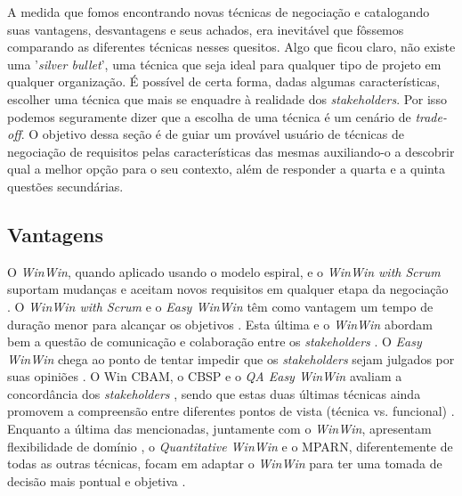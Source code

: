  A medida que fomos encontrando novas técnicas de negociação e catalogando suas
 vantagens, desvantagens e seus achados, era
 inevitável que fôssemos comparando as diferentes técnicas nesses quesitos.
 Algo que ficou claro, não existe uma '\textit{silver bullet}', uma técnica que
 seja ideal para qualquer tipo de projeto em qualquer organização. É possível de certa forma, dadas algumas características, escolher uma técnica que mais se enquadre à realidade dos \textit{stakeholders}. Por isso podemos seguramente
 dizer que a escolha de uma técnica é um cenário de \textit{trade-off}. O
 objetivo dessa seção é de guiar um provável usuário de técnicas de negociação
 de requisitos pelas características das mesmas auxiliando-o a descobrir qual
 a melhor opção para o seu contexto, além de responder a quarta e a quinta questões secundárias.

\subsection{Vantagens}

O \textit{WinWin}, quando aplicado usando o modelo espiral, e o \textit{WinWin
with Scrum} suportam mudanças e aceitam novos requisitos em qualquer etapa da
 negociação \cite{boehm2001developing}\cite{khan2014integration}.
O \textit{WinWin with Scrum} e o \textit{Easy WinWin} têm como vantagem um tempo
de duração menor para alcançar os objetivos
\cite{khan2014integration}\cite{briggs2002easywinwin}. Esta última e o
\textit{WinWin} abordam bem a questão de comunicação e colaboração entre os
\textit{stakeholders} \cite{grunbacher2001surfacing}\cite{boehm1998winwin}.
O \textit{Easy WinWin} chega ao ponto de tentar impedir que os
\textit{stakeholders} sejam julgados por suas opiniões
\cite{gruenbacher2000collaborative}.
O Win CBAM, o CBSP e o \textit{QA Easy WinWin} avaliam a concordância dos
\textit{stakeholders}
\cite{kazman2005requirements}\cite{grunbacher2001reconciling}\cite{grunbacher2004integrating},
sendo que estas duas últimas técnicas ainda promovem a compreensão entre
diferentes pontos de vista (técnica vs. funcional)
\cite{grunbacher2001reconciling}\cite{grunbacher2004integrating}. Enquanto a
última das mencionadas, juntamente com o \textit{WinWin}, apresentam
flexibilidade de domínio \cite{grunbacher2004integrating}\cite{boehm1997developing}, o
\textit{Quantitative WinWin} e o MPARN, diferentemente de todas as outras
técnicas, focam em adaptar o \textit{WinWin} para ter uma tomada de decisão mais
pontual e objetiva \cite{ruhe2002quantitative}\cite{in2004requirements}.


